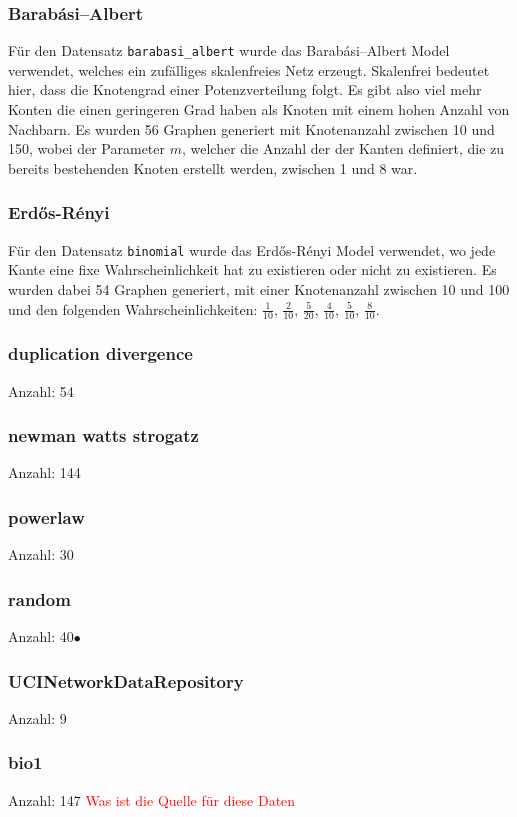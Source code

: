 \documentclass[12pt,a4paper,onecolumn,oneside,titlepage]{article}
\newcommand{\vars}{\texttt}
\newcommand\todo[1]{\textcolor{red}{#1}}
\begin{document}
\subsubsection{Barabási–Albert}
Für den Datensatz \vars{barabasi\_albert} wurde das Barabási–Albert Model verwendet, welches ein zufälliges skalenfreies Netz erzeugt.\cite{Albert02}
Skalenfrei bedeutet hier, dass die Knotengrad einer Potenzverteilung folgt. Es gibt also viel mehr Konten die einen geringeren Grad haben als Knoten mit einem hohen Anzahl von Nachbarn. Es wurden 56 Graphen generiert mit Knotenanzahl zwischen 10 und 150, wobei der Parameter $m$, welcher die Anzahl der der Kanten definiert, die zu bereits bestehenden Knoten erstellt werden, zwischen 1 und 8 war.
\subsubsection{Erdős-Rényi}
Für den Datensatz \vars{binomial} wurde das Erdős-Rényi Model verwendet\cite{Gilbert59}, wo jede Kante eine fixe Wahrscheinlichkeit hat zu existieren oder nicht zu existieren.
Es wurden dabei 54 Graphen generiert, mit einer Knotenanzahl zwischen 10 und 100 und den folgenden Wahrscheinlichkeiten: $\frac{1}{10}$, $\frac{2}{10}$, $\frac{5}{20}$, $\frac{4}{10}$, $\frac{5}{10}$, $\frac{8}{10}$.


\subsubsection{duplication divergence}
Anzahl: 54
\subsubsection{newman watts strogatz}
Anzahl: 144
\subsubsection{powerlaw}
Anzahl: 30
\subsubsection{random}
Anzahl: 40$•$

\subsubsection{UCINetworkDataRepository}
Anzahl: 9
\subsubsection{bio1}
Anzahl: 147
\todo{Was ist die Quelle für diese Daten}
\end{document}
